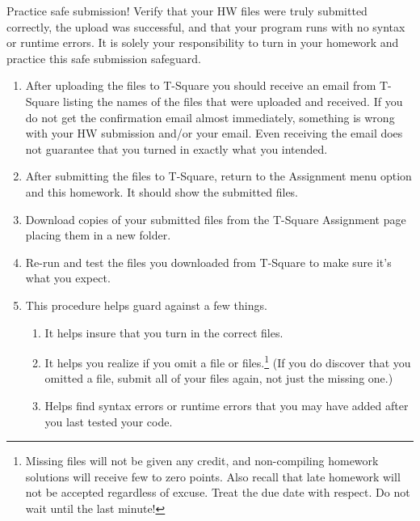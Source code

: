 \documentclass[12pt]{article}
\begin{document}
Practice safe submission! Verify that your HW files were truly submitted correctly, the upload was successful, and that your program runs with no syntax or runtime errors. It is solely your responsibility to turn in your homework and practice this safe submission safeguard.

\begin{enumerate}
\itemsep0em
\item After uploading the files to T-Square you should receive an email from T-Square listing the names of the files that were uploaded and received. If you do not get the confirmation email almost immediately, something is wrong with your HW submission and/or your email. Even receiving the email does not guarantee that you turned in exactly what you intended.
\item After submitting the files to T-Square, return to the Assignment menu option and this homework. It should show the submitted files.
\item Download copies of your submitted files from the T-Square Assignment page placing them in a new folder.
\item Re-run and test the files you downloaded from T-Square to make sure it's what you expect.
\item This procedure helps guard against a few things.
\begin{enumerate}
\itemsep0em
\item It helps insure that you turn in the correct files.
\item It helps you realize if you omit a file or files.\footnote{Missing files will not be given any credit, and non-compiling homework solutions will receive few to zero points. Also recall that late homework will not be accepted regardless of excuse. Treat the due date with respect.  Do not wait until the last minute!}
(If you do discover that you omitted a file, submit all of your files again, not just the missing one.)
\item Helps find syntax errors or runtime errors that you may have added after you last tested your code.
\end{enumerate}
\end{enumerate}
\end{document}
